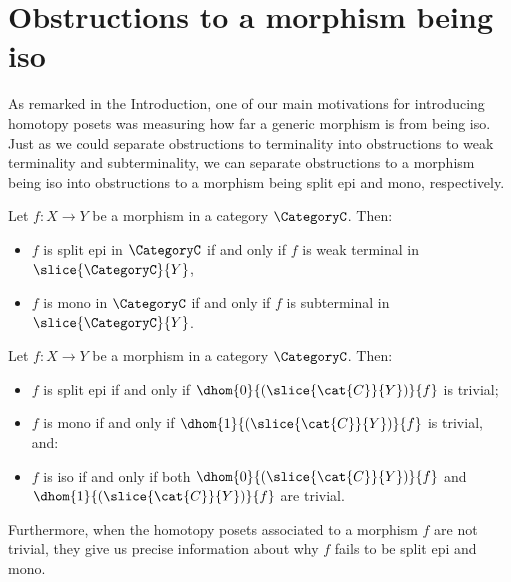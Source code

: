 \section{Obstructions to a morphism being iso} \label{sec: obstructions}


As remarked in the Introduction, one of our main motivations for introducing homotopy posets was measuring how far a generic morphism is from being iso.
Just as we could separate obstructions to terminality into obstructions to weak terminality and subterminality, we can separate obstructions to a morphism being iso into obstructions to a morphism being split epi and mono, respectively.
%
%
\begin{proposition}\label{prop: spit epi weak term mono subterm}
    Let $f\colon X \to Y$ be a morphism in a category $\CategoryC$. Then:
    \begin{itemize}
        \item $f$ is split epi in $\CategoryC$ if and only if $f$ is weak terminal in $\slice{\CategoryC}{Y}$,
        \item $f$ is mono in $\CategoryC$ if and only if $f$ is subterminal in $\slice{\CategoryC}{Y}$.
    \end{itemize}
\end{proposition}
%
%
\begin{corollary}\label{cor: spit epi iff dhom0 trivial mono iff dhom1 trivial}
    Let $f: X \to Y$ be a morphism in a category $\CategoryC$. Then:
    \begin{itemize}
        \item $f$ is split epi if and only if $\dhom{0}{(\slice{\cat{C}}{Y})}{f}$ is trivial;
        \item $f$ is mono if and only if $\dhom{1}{(\slice{\cat{C}}{Y})}{f}$ is trivial, and:
        \item $f$ is iso if and only if both $\dhom{0}{(\slice{\cat{C}}{Y})}{f}$ and $\dhom{1}{(\slice{\cat{C}}{Y})}{f}$ are trivial.
    \end{itemize}
\end{corollary}
%
Furthermore, when the homotopy posets associated to a morphism $f$ are not trivial, they give us precise information about why $f$ fails to be split epi and mono.

